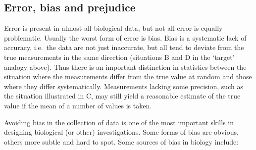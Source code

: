 \documentclass[]{book}
\begin{document}
\subsection{Error, bias and prejudice}\label{error-bias-and-prejudice}

Error is present in almost all biological data, but not all error is
equally problematic. Usually the worst form of error is bias. Bias is a
systematic lack of accuracy, i.e.~the data are not just inaccurate, but
all tend to deviate from the true measurements in the same direction
(situations B and D in the `target' analogy above). Thus there is an
important distinction in statistics between the situation where the
measurements differ from the true value at random and those where they
differ systematically. Measurements lacking some precision, such as the
situation illustrated in C, may still yield a reasonable estimate of the
true value if the mean of a number of values is taken.

Avoiding bias in the collection of data is one of the most important
skills in designing biological (or other) investigations. Some forms of
bias are obvious, others more subtle and hard to spot. Some sources of
bias in biology include:
\end{document}
